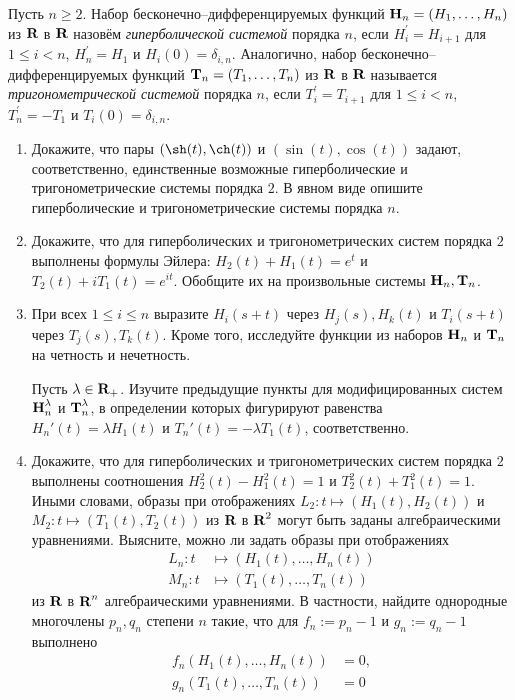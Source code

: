 \newcommand{\mmH}{\text{\bf H}}
\newcommand{\mmT}{\text{\bf T}}

Пусть $n \geq 2$. Набор бесконечно--дифференцируемых функций $\mmH_n = (H_1, \ldots, H_n)$ из $\text{\bf R}$ в $\text{\bf R}$ назовём {\it гиперболической системой} порядка $n$, если $H_i^\prime = H_{i+1}$ для $1 \leq i < n$, $H_n^\prime = H_1$ и $H_i(0) = \delta_{i,n}$. Аналогично, набор бесконечно--дифференцируемых функций $\mmT_n = (T_1, \ldots, T_n)$ из $\text{\bf R}$ в $\text{\bf R}$ называется {\it тригонометрической системой} порядка $n$, если $T_i^\prime = T_{i+1}$ для $1 \leq i < n$, $T_n^\prime = - T_1$ и $T_i(0) = \delta_{i,n}$. 

\begin{enumerate}
\item Докажите, что пары $\left(\sh(t), \ch(t)  \right)$ и $\left(\sin(t), \cos(t)\right)$ задают, соответственно, единственные возможные гиперболические и тригонометрические системы порядка $2$. В явном виде опишите гиперболические и тригонометрические системы порядка $n$. 

\item Докажите, что для гиперболических и тригонометрических систем порядка $2$ выполнены
формулы Эйлера: $H_2(t) + H_1(t) = e^t$ и $T_2(t) + i T_1(t) = e^{it}.$ Обобщите их на произвольные системы $\mmH_n, \mmT_n$.

\item При всех $1 \leq i \leq n$ выразите $H_i(s+t)$ через $H_j(s), H_k(t)$ и $T_i(s+t)$ через $T_j(s), T_k(t)$. Кроме того, исследуйте функции из наборов $\mmH_n$ и $\mmT_n$ на четность и нечетность.

Пусть $\lambda \in \text{\bf R}_+$. Изучите предыдущие пункты для модифицированных систем $\mmH_n^\lambda$ и $\mmT_n^\lambda$, в определении которых фигурируют равенства $H_n'(t) = \lambda H_1(t)$ и $T_n'(t) = -\lambda T_1(t)$, соответственно.
\item Докажите, что для гиперболических и тригонометрических систем порядка $2$ выполнены соотношения $H_2^2(t) - H_1^2(t) = 1$ и $T_2^2(t) + T_1^2(t) = 1.$ Иными словами, образы при отображениях $L_2: t \mapsto (H_1(t), H_2(t))$ и $M_2: t \mapsto (T_1(t), T_2(t))$ из $\text{\bf R}$ в $\text{\bf R}^2$ могут быть заданы алгебраическими уравнениями. Выясните, можно ли задать образы при отображениях 
\begin{align*}
L_n: t &\longmapsto (H_1(t), \ldots, H_n(t)) \\
M_n: t &\longmapsto (T_1(t), \ldots, T_n(t))
\end{align*}
из $\text{\bf R}$ в $\text{\bf R}^n$ алгебраическими уравнениями. В частности, найдите однородные многочлены $p_n, q_n$ степени $n$ такие, что для $f_n:=p_n - 1$ и $g_n := q_n-1$ выполнено
\begin{align*}
f_n(H_1(t), \ldots, H_n(t)) &= 0, \\
g_n(T_1(t), \ldots, T_n(t)) &= 0
\end{align*} 


\end{enumerate}
